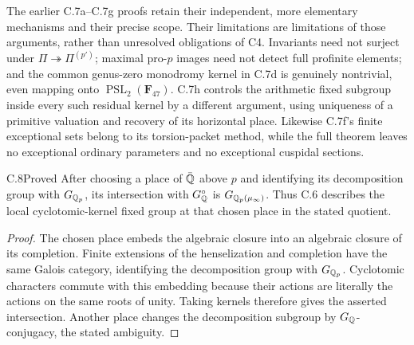 The earlier C.7a--C.7g proofs retain their independent, more elementary
mechanisms and their precise scope. Their limitations are limitations
of those arguments, rather than unresolved obligations of C4.
Invariants need not surject under $\Pi\twoheadrightarrow\Pi^{(p')}$;
maximal pro-$p$ images need not detect full profinite elements; and the
common genus-zero monodromy kernel in C.7d is genuinely nontrivial,
even mapping onto $\operatorname{PSL}_2(\mathbf F_{47})$. C.7h
controls the arithmetic fixed subgroup inside every such residual
kernel by a different argument, using uniqueness of a primitive
valuation and recovery of its horizontal place. Likewise C.7f's
finite exceptional sets belong to its torsion-packet method, while
the full theorem leaves no exceptional ordinary parameters and no
exceptional cuspidal sections.

\begin{claim}{C.8}{Proved}
After choosing a place of $\bar{\mathbb Q}$ above $p$ and identifying its decomposition
group with $G_{\mathbb Q_p}$, its intersection with $G_\mathbb Q^\circ$ is
$G_{\mathbb Q_p(\mu_\infty)}$. Thus C.6 describes the local cyclotomic-kernel fixed
group at that chosen place in the stated quotient.
\end{claim}
\begin{proof}
The chosen place embeds the algebraic closure into an algebraic closure of
its completion. Finite extensions of the henselization and completion
have the same Galois category, identifying the decomposition group with
$G_{\mathbb Q_p}$. Cyclotomic characters commute with this embedding because
their actions are literally the actions on the same roots of unity.
Taking kernels therefore gives the asserted intersection. Another place
changes the decomposition subgroup by $G_\mathbb Q$-conjugacy, the stated ambiguity.
\end{proof}

